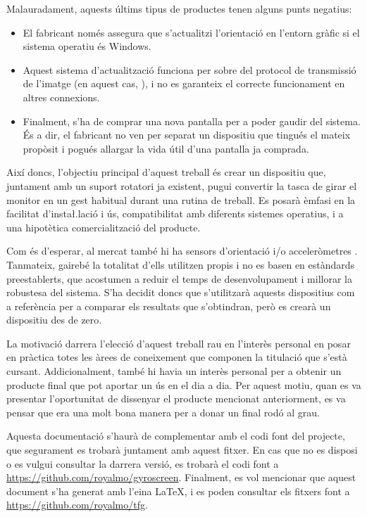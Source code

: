 Malauradament, aquests últims tipus de productes tenen alguns punts negatius:
\begin{itemize}
    \item El fabricant només assegura que s'actualitzi l'orientació en l'entorn
    gràfic si el sistema operatiu és Windows.
    \item Aquest sistema d'actualització funciona per sobre del protocol de
    transmissió de l'imatge (en aquest cas, ), i no es garanteix el correcte
    funcionament en altres connexions.
    \item Finalment, s'ha de comprar una nova pantalla per a poder gaudir del
    sistema. És a dir, el fabricant no ven per separat un dispositiu que tingués
    el mateix propòsit i pogués allargar la vida útil d'una pantalla ja
    comprada.
\end{itemize}

Així doncs, l'objectiu principal d'aquest treball és crear un dispositiu que,
juntament amb un suport rotatori ja existent, pugui convertir la tasca de girar
el monitor en un gest habitual durant una rutina de treball. Es posarà èmfasi en
la facilitat d'insta\l.lació i ús, compatibilitat amb diferents sistemes
operatius, i a una hipotètica comercialització del producte.

Com és d'esperar, al mercat també hi ha sensors d'orientació i/o acceleròmetres
 \cite{Yocto3D}. Tanmateix, gairebé la totalitat d'ells utilitzen
 propis i no es basen en estàndards preestablerts, que acostumen
a reduir el temps de desenvolupament i millorar la robustesa del sistema. S'ha
decidit doncs que s'utilitzarà aquests dispositius com a referència per a
comparar els resultats que s'obtindran, però es crearà un dispositiu des de zero.

La motivació darrera l'elecció d'aquest treball rau en l'interès personal en
posar en pràctica totes les àrees de coneixement que componen la titulació que
s'està cursant. Addicionalment, també hi havia un interès personal per a obtenir
un producte final que pot aportar un ús en el dia a dia. Per aquest motiu, quan
es va presentar l'oportunitat de dissenyar el producte mencionat anteriorment,
es va pensar que era una molt bona manera per a donar un final rodó al grau.

Aquesta documentació s'haurà de complementar amb el codi font del projecte, que
segurament es trobarà juntament amb aquest fitxer. En cas que no es disposi o
es vulgui consultar la darrera versió, es trobarà el codi font a
\url{https://github.com/royalmo/gyroscreen}.
Finalment, es vol mencionar que aquest document s'ha generat amb l'eina \LaTeX,
i es poden consultar els fitxers font a \url{https://github.com/royalmo/tfg}.

